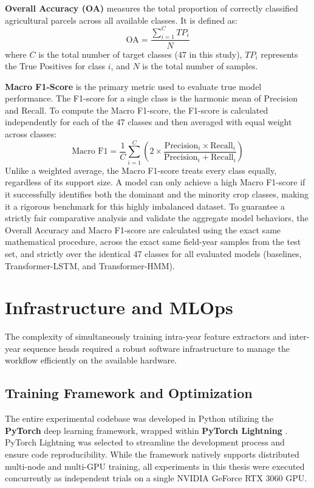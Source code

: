 \textbf{Overall Accuracy (OA)} measures the total proportion of correctly classified agricultural parcels across all available classes. It is defined as:
$$ \text{OA} = \frac{\sum_{i=1}^{C} TP_i}{N} $$
where $C$ is the total number of target classes (47 in this study), $TP_i$ represents the True Positives for class $i$, and $N$ is the total number of samples.

\textbf{Macro F1-Score} is the primary metric used to evaluate true model performance. The F1-score for a single class is the harmonic mean of Precision and Recall.
To compute the Macro F1-score, the F1-score is calculated independently for each of the 47 classes and then averaged with equal weight across classes:
$$ \text{Macro F1} = \frac{1}{C} \sum_{i=1}^{C} \left( 2 \times \frac{\text{Precision}_i \times \text{Recall}_i}{\text{Precision}_i + \text{Recall}_i} \right) $$
Unlike a weighted average, the Macro F1-score treats every class equally, regardless of its support size.
A model can only achieve a high Macro F1-score if it successfully identifies both the dominant and the minority crop classes,
making it a rigorous benchmark for this highly imbalanced dataset.
To guarantee a strictly fair comparative analysis and validate the aggregate model behaviors,
the Overall Accuracy and Macro F1-score are calculated using the exact same mathematical procedure,
across the exact same field-year samples from the test set, and strictly over the identical 47 classes
for all evaluated models (baselines, Transformer-LSTM, and Transformer-HMM).


\section{Infrastructure and MLOps}
\label{sec:infrastructure_mlops}

The complexity of simultaneously training intra-year feature extractors and inter-year sequence heads required
a robust software infrastructure to manage the workflow efficiently on the available hardware.

\subsection{Training Framework and Optimization}
The entire experimental codebase was developed in Python utilizing the \textbf{PyTorch} deep learning framework,
wrapped within \textbf{PyTorch Lightning} \cite{falcon2019pytorch}.
PyTorch Lightning was selected to streamline the development process and ensure code reproducibility.
While the framework natively supports distributed multi-node and multi-GPU training,
all experiments in this thesis were executed concurrently as independent trials on a single NVIDIA GeForce RTX 3060 GPU.

